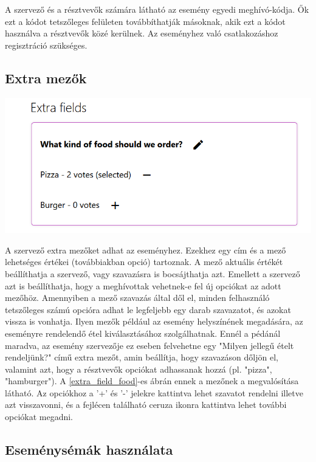 \documentclass[a4paper,12pt]{report}
\theoremstyle{definition}
\theoremstyle{remark}
\begin{document}
A szervező és a résztvevők számára látható az esemény egyedi meghívó-kódja. Ők ezt a kódot tetszőleges felületen továbbíthatják másoknak, akik ezt a kódot használva a résztvevők közé kerülnek. Az eseményhez való csatlakozáshoz regisztráció szükséges.

	\subsection{Extra mezők}

\begin{center}
\includegraphics[width=150mm]{extra_field_food}
\captionsetup{width=0.8\linewidth}
\label{extra_field_food}
\end{center}

A szervező extra mezőket adhat az eseményhez. Ezekhez egy cím és a mező lehetséges értékei (továbbiakban opció) tartoznak. A mező aktuális értékét beállíthatja a szervező, vagy szavazásra is bocsájthatja azt. Emellett a szervező azt is beállíthatja, hogy a meghívottak vehetnek-e fel új opciókat az adott mezőhöz. Amennyiben a mező szavazás által dől el, minden felhasználó tetszőleges számú opcióra adhat le legfeljebb egy darab szavazatot, és azokat vissza is vonhatja. Ilyen mezők például az esemény helyszínének megadására, az eseményre rendelendő étel kiválasztásához szolgálhatnak. Ennél a pédánál maradva, az esemény szervezője ez eseben felvehetne egy "Milyen jellegű ételt rendeljünk?" című extra mezőt, amin beállítja, hogy szavazáson dőljön el, valamint azt, hogy a résztvevők opciókat adhassanak hozzá (pl. "pizza", "hamburger").  A \ref{extra_field_food}-es ábrán ennek a mezőnek a megvalósítása látható. Az opciókhoz a '+' és '-' jelekre kattintva lehet szavatot rendelni illetve azt visszavonni, és a fejlécen található ceruza ikonra kattintva lehet további opciókat megadni.

	\subsection{Eseménysémák használata}
\end{document}
